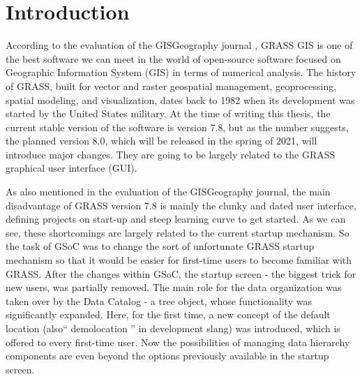 \documentclass[a4paper,10pt,twoside]{article}
\begin{document}
\newpage
\vspace*{-1cm}
\pagestyle{fancy}
\section{Introduction}
\large
\setcounter{page}{13}  %

\noindent According to the evaluation of the GISGeography journal \cite{gisgeography}, GRASS GIS is one of the best software we can meet in the world of open-source software focused on Geographic Information System (GIS) in terms of numerical analysis. The history of GRASS, built for vector and raster geospatial management, geoprocessing, spatial modeling, and visualization, dates back to 1982 when its development was started by the United States military. At the time of writing this thesis, the current stable version of the software is version 7.8, but as the number suggests, the planned version 8.0, which will be released in the spring of 2021, will introduce major changes. They are going to be largely related to the GRASS graphical user interface (GUI).

As also mentioned in the evaluation of the GISGeography journal, the main disadvantage of GRASS version 7.8 is mainly the clunky and dated user interface, defining projects on start-up and steep learning curve to get started. As we can see, these shortcomings are largely related to the current startup mechanism. So the task of GSoC was to change the sort of unfortunate GRASS startup mechanism so that it would be easier for first-time users to become familiar with GRASS. After the changes within GSoC, the startup screen -  the biggest trick for new users, was partially removed. The main role for the data organization was taken over by the Data Catalog - a tree object, whose functionality was significantly expanded. Here, for the first time, a new concept of the default location (also`` demolocation '' in development slang) was introduced, which is offered to every first-time user. Now the possibilities of managing data hierarchy components are even beyond the options previously available in the startup screen. 
\end{document}
